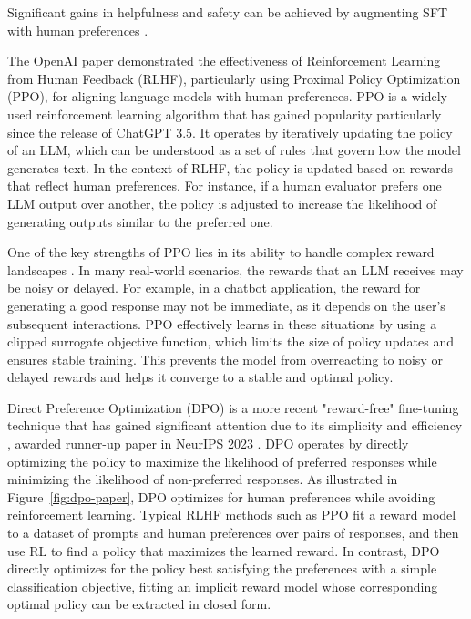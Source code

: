Significant gains in helpfulness and safety can be achieved by augmenting SFT with human preferences .

The OpenAI paper  demonstrated the effectiveness of Reinforcement Learning from Human Feedback (RLHF), particularly using Proximal Policy Optimization (PPO), for aligning language models with human preferences. PPO  is a widely used reinforcement learning algorithm that has gained popularity particularly since the release of ChatGPT 3.5. It operates by iteratively updating the policy of an LLM, which can be understood as a set of rules that govern how the model generates text. In the context of RLHF, the policy is updated based on rewards that reflect human preferences. For instance, if a human evaluator prefers one LLM output over another, the policy is adjusted to increase the likelihood of generating outputs similar to the preferred one.

One of the key strengths of PPO lies in its ability to handle complex reward landscapes . In many real-world scenarios, the rewards that an LLM receives may be noisy or delayed. For example, in a chatbot application, the reward for generating a good response may not be immediate, as it depends on the user's subsequent interactions. PPO effectively learns in these situations by using a clipped surrogate objective function, which limits the size of policy updates and ensures stable training. This prevents the model from overreacting to noisy or delayed rewards and helps it converge to a stable and optimal policy.

Direct Preference Optimization (DPO) is a more recent "reward-free" fine-tuning technique that has gained significant attention due to its simplicity and efficiency , awarded runner-up paper in NeurIPS 2023 . DPO operates by directly optimizing the policy to maximize the likelihood of preferred responses while minimizing the likelihood of non-preferred responses. As illustrated in Figure~\ref{fig:dpo-paper}, DPO optimizes for human preferences while avoiding reinforcement learning. Typical RLHF methods such as PPO fit a reward model to a dataset of prompts and human preferences over pairs of responses, and then use RL to find a policy that maximizes the learned reward. In contrast, DPO directly optimizes for the policy best satisfying the preferences with a simple classification objective, fitting an implicit reward model whose corresponding optimal policy can be extracted in closed form.

